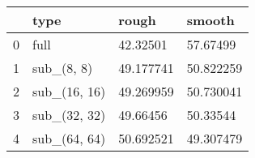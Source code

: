 \begin{tabular}{llll}
\toprule
{} &          type &      rough &     smooth \\
\midrule
0 &          full &   42.32501 &   57.67499 \\
1 &    sub\_(8, 8) &  49.177741 &  50.822259 \\
2 &  sub\_(16, 16) &  49.269959 &  50.730041 \\
3 &  sub\_(32, 32) &   49.66456 &   50.33544 \\
4 &  sub\_(64, 64) &  50.692521 &  49.307479 \\
\bottomrule
\end{tabular}
